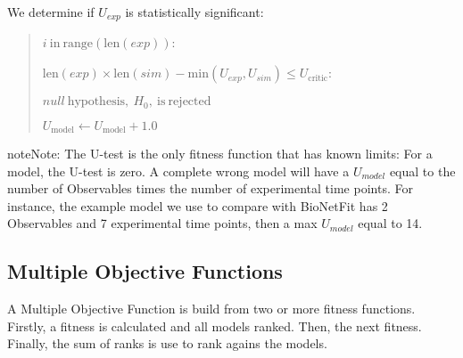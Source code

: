 \documentclass[letterpaper,10pt,english]{sphinxmanual}
\begin{document}
\begin{enumerate}
\def\theenumi{\arabic{enumi}}
\def\labelenumi{\theenumi .}
\makeatletter\def\p@enumii{\p@enumi \theenumi .}\makeatother
\setcounter{enumi}{1}
\item {} 
We determine if \(U_{exp}\) is statistically significant:
\begin{quote}

\begin{DUlineblock}{0em}
\item[]  \(i \mathrm{\ in\ } \mathrm{range} ( \mathrm{len}(exp) )\):
\item[]
\begin{DUlineblock}{\DUlineblockindent}
\item[]  \(\mathrm{len}(exp) \times \mathrm{len}(sim) - \mathrm{min}(U_{exp}, U_{sim}) \leq U_{\mathrm{critic}}\):
\item[]
\begin{DUlineblock}{\DUlineblockindent}
\item[] \(\mathrm{\textit{null}\ hypothesis,\ }H_{0}\mathrm{,\ is\ rejected}\)
\item[] \(U_{\mathrm{model}} \gets U_{\mathrm{model}} + 1.0\)
\end{DUlineblock}
\end{DUlineblock}
\end{DUlineblock}
\end{quote}

\end{enumerate}

\begin{sphinxadmonition}{note}{Note:}
The U-test is the only fitness function that has known limits: For a
 model, the U-test is zero. A complete wrong model will have a
\(U_{model}\) equal to the number of Observables times the number of
experimental time points. For instance, the example model we use to compare
with BioNetFit has 2 Observables and 7 experimental time points, then a max
\(U_{model}\) equal to 14.
\end{sphinxadmonition}


\subsection{Multiple Objective Functions}
\label{\detokenize{functions/multiple:multiple-objective-functions}}\label{\detokenize{functions/multiple::doc}}
A Multiple Objective Function is build from two or more fitness functions.
Firstly, a fitness is calculated and all models ranked. Then, the next fitness.
Finally, the sum of ranks is use to rank agains the models.
\end{document}

